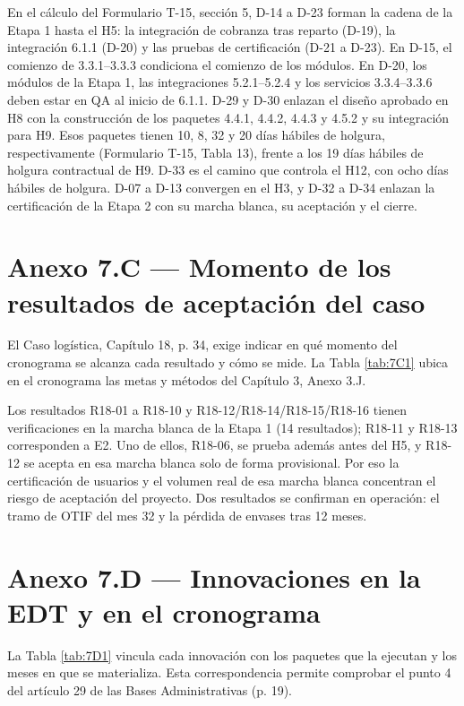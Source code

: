 
En el cálculo del Formulario T-15, sección 5, D-14 a D-23 forman la cadena de la Etapa 1 hasta el H5: la integración de cobranza tras reparto (D-19), la integración 6.1.1 (D-20) y las pruebas de certificación (D-21 a D-23). En D-15, el comienzo de 3.3.1–3.3.3 condiciona el comienzo de los módulos. En D-20, los módulos de la Etapa 1, las integraciones 5.2.1–5.2.4 y los servicios 3.3.4–3.3.6 deben estar en QA al inicio de 6.1.1. D-29 y D-30 enlazan el diseño aprobado en H8 con la construcción de los paquetes 4.4.1, 4.4.2, 4.4.3 y 4.5.2 y su integración para H9. Esos paquetes tienen 10, 8, 32 y 20 días hábiles de holgura, respectivamente (Formulario T-15, Tabla 13), frente a los 19 días hábiles de holgura contractual de H9. D-33 es el camino que controla el H12, con ocho días hábiles de holgura. D-07 a D-13 convergen en el H3, y D-32 a D-34 enlazan la certificación de la Etapa 2 con su marcha blanca, su aceptación y el cierre.

\section{Anexo 7.C — Momento de los resultados de aceptación del caso}

El Caso logística, Capítulo 18, p. 34, exige indicar en qué momento del cronograma se alcanza cada resultado y cómo se mide. La Tabla \ref{tab:7C1} ubica en el cronograma las metas y métodos del Capítulo 3, Anexo 3.J.


Los resultados R18-01 a R18-10 y R18-12/\allowbreak{}R18-14/\allowbreak{}R18-15/\allowbreak{}R18-16 tienen verificaciones en la marcha blanca de la Etapa 1 (14 resultados); R18-11 y R18-13 corresponden a E2. Uno de ellos, R18-06, se prueba además antes del H5, y R18-12 se acepta en esa marcha blanca solo de forma provisional. Por eso la certificación de usuarios y el volumen real de esa marcha blanca concentran el riesgo de aceptación del proyecto. Dos resultados se confirman en operación: el tramo de OTIF del mes 32 y la pérdida de envases tras 12 meses.

\section{Anexo 7.D — Innovaciones en la EDT y en el cronograma}

La Tabla \ref{tab:7D1} vincula cada innovación con los paquetes que la ejecutan y los meses en que se materializa. Esta correspondencia permite comprobar el punto 4 del artículo 29 de las Bases Administrativas (p. 19).

